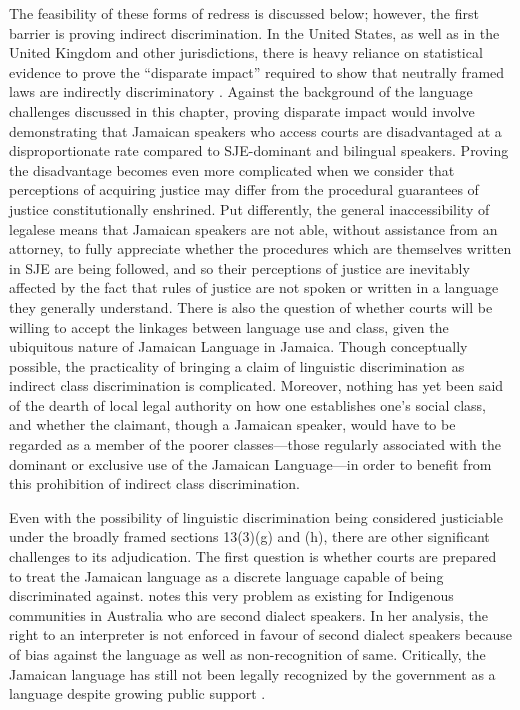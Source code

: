 \documentclass[output=paper,colorlinks,citecolor=brown]{langscibook}
\begin{document}
The feasibility of these forms of redress is discussed below; however, the first barrier is proving indirect discrimination. In the United States, as well as in the United Kingdom and other jurisdictions, there is heavy reliance on statistical evidence to prove the “disparate impact” required to show that neutrally framed laws are indirectly discriminatory \citep{BarnardHepple1999}. Against the background of the language challenges discussed in this chapter, proving disparate impact would involve demonstrating that Jamaican speakers who access courts are disadvantaged at a disproportionate rate compared to SJE-dominant and bilingual speakers. Proving the disadvantage becomes even more complicated when we consider that perceptions of acquiring justice may differ from the procedural guarantees of justice constitutionally enshrined. Put differently, the general inaccessibility of legalese means that Jamaican speakers are not able, without assistance from an attorney, to fully appreciate whether the procedures which are themselves written in SJE are being followed, and so their perceptions of justice are inevitably affected by the fact that rules of justice are not spoken or written in a language they generally understand. There is also the question of whether courts will be willing to accept the linkages between language use and class, given the ubiquitous nature of Jamaican Language in Jamaica. Though conceptually possible, the practicality of bringing a claim of linguistic discrimination as indirect class discrimination is complicated. Moreover, nothing has yet been said of the dearth of local legal authority on how one establishes one’s social class, and whether the claimant, though a Jamaican speaker, would have to be regarded as a member of the poorer classes—those regularly associated with the dominant or exclusive use of the Jamaican Language—in order to benefit from this prohibition of indirect class discrimination.

Even with the possibility of linguistic discrimination being considered justiciable under the broadly framed sections 13(3)(g) and (h), there are other significant challenges to its adjudication. The first question is whether courts are prepared to treat the Jamaican language as a discrete language capable of being discriminated against. \citet{Eades2003} notes this very problem as existing for Indigenous communities in Australia who are second dialect speakers. In her analysis, the right to an interpreter is not enforced in favour of second dialect speakers because of bias against the language as well as non-recognition of same. Critically, the Jamaican language has still not been legally recognized by the government as a language despite growing public support \citep{JamaicanLanguageUnit2005}.
\end{document}
